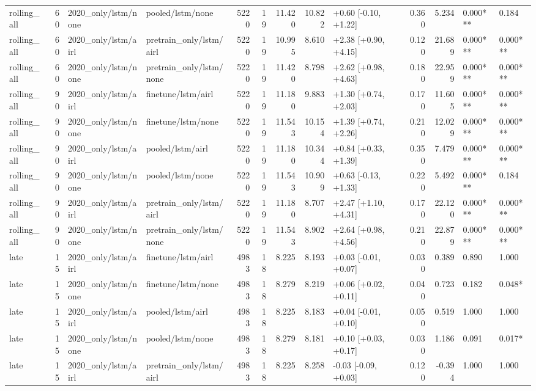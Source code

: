\begin{tabular}{lrllrrrrlrrll}
rolling_all & 60 & 2020_only/lstm/none & pooled/lstm/none & 5220 & 19 & 11.420 & 10.822 & +0.60 [-0.10, +1.22] & 0.360 & 5.234 & 0.000*** & 0.184 \\
rolling_all & 60 & 2020_only/lstm/airl & pretrain_only/lstm/airl & 5220 & 19 & 10.995 & 8.610 & +2.38 [+0.90, +4.15] & 0.120 & 21.689 & 0.000*** & 0.000*** \\
rolling_all & 60 & 2020_only/lstm/none & pretrain_only/lstm/none & 5220 & 19 & 11.420 & 8.798 & +2.62 [+0.98, +4.63] & 0.180 & 22.959 & 0.000*** & 0.000*** \\
rolling_all & 90 & 2020_only/lstm/airl & finetune/lstm/airl & 5220 & 19 & 11.180 & 9.883 & +1.30 [+0.74, +2.03] & 0.170 & 11.605 & 0.000*** & 0.000*** \\
rolling_all & 90 & 2020_only/lstm/none & finetune/lstm/none & 5220 & 19 & 11.543 & 10.154 & +1.39 [+0.74, +2.26] & 0.210 & 12.029 & 0.000*** & 0.000*** \\
rolling_all & 90 & 2020_only/lstm/airl & pooled/lstm/airl & 5220 & 19 & 11.180 & 10.344 & +0.84 [+0.33, +1.39] & 0.350 & 7.479 & 0.000*** & 0.000*** \\
rolling_all & 90 & 2020_only/lstm/none & pooled/lstm/none & 5220 & 19 & 11.543 & 10.909 & +0.63 [-0.13, +1.33] & 0.220 & 5.492 & 0.000*** & 0.184 \\
rolling_all & 90 & 2020_only/lstm/airl & pretrain_only/lstm/airl & 5220 & 19 & 11.180 & 8.707 & +2.47 [+1.10, +4.31] & 0.170 & 22.120 & 0.000*** & 0.000*** \\
rolling_all & 90 & 2020_only/lstm/none & pretrain_only/lstm/none & 5220 & 19 & 11.543 & 8.902 & +2.64 [+0.98, +4.56] & 0.210 & 22.879 & 0.000*** & 0.000*** \\
late & 15 & 2020_only/lstm/airl & finetune/lstm/airl & 4983 & 18 & 8.225 & 8.193 & +0.03 [-0.01, +0.07] & 0.030 & 0.389 & 0.890 & 1.000 \\
late & 15 & 2020_only/lstm/none & finetune/lstm/none & 4983 & 18 & 8.279 & 8.219 & +0.06 [+0.02, +0.11] & 0.040 & 0.723 & 0.182 & 0.048* \\
late & 15 & 2020_only/lstm/airl & pooled/lstm/airl & 4983 & 18 & 8.225 & 8.183 & +0.04 [-0.01, +0.10] & 0.050 & 0.519 & 1.000 & 1.000 \\
late & 15 & 2020_only/lstm/none & pooled/lstm/none & 4983 & 18 & 8.279 & 8.181 & +0.10 [+0.03, +0.17] & 0.030 & 1.186 & 0.091 & 0.017* \\
late & 15 & 2020_only/lstm/airl & pretrain_only/lstm/airl & 4983 & 18 & 8.225 & 8.258 & -0.03 [-0.09, +0.03] & 0.120 & -0.394 & 1.000 & 1.000 \\

\end{tabular}
